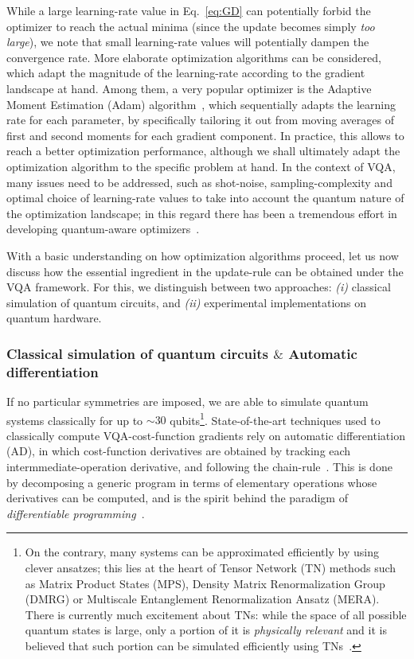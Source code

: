 While a large learning-rate value in Eq.~\ref{eq:GD} can potentially forbid the optimizer to reach the actual minima (since the update becomes simply \textit{too large}), we note that small learning-rate values will potentially dampen the convergence rate. More elaborate optimization algorithms can be considered, which adapt the magnitude of the learning-rate according to the gradient landscape at hand. Among them, a very popular optimizer is the Adaptive Moment Estimation (Adam) algorithm~\cite{kingma2015adam}, which sequentially adapts the learning rate for each parameter, by specifically tailoring it out from moving averages of first and second moments for each gradient component. In practice, this allows to reach a better optimization performance, although we shall ultimately adapt the optimization algorithm to the specific problem at hand. In the context of VQA, many issues need to be addressed, such as shot-noise, sampling-complexity and optimal choice of learning-rate values to take into account the quantum nature of the optimization landscape; in this regard there has been a tremendous effort in developing quantum-aware optimizers~\cite{verdon2018universal,kubler2020adaptive,arrasmith2020operator,stokes2020quantum,koczor2019quantum,nakanishi2020sequential,fontana2020optimizing,gu2021adaptive}.

With a basic understanding on how optimization algorithms proceed, let us now discuss how the essential ingredient in the update-rule can be obtained under the VQA framework. For this, we distinguish between two approaches: \textit{(i)} classical simulation of quantum circuits, and \textit{(ii)} experimental implementations on quantum hardware.

\subsubsection{Classical simulation of quantum circuits $\&$ Automatic differentiation}
If no particular symmetries are imposed, we are able to simulate quantum systems classically for up to $\sim 30$ qubits\footnote{On the contrary, many systems can be approximated efficiently by using clever ansatzes; this lies at the heart of Tensor Network (TN) methods such as Matrix Product States (MPS), Density Matrix Renormalization Group (DMRG) or Multiscale Entanglement Renormalization Ansatz (MERA). There is currently much excitement about TNs: while the space of all possible quantum states is large, only a portion of it is \textit{physically relevant} and it is believed that such portion can be simulated efficiently using TNs~\cite{Biamonte2017tensornetworks,orusTN}.}.
%
State-of-the-art techniques used to classically compute VQA-cost-function gradients rely on automatic differentiation (AD), in which cost-function derivatives are obtained by tracking each intermmediate-operation derivative, and following the chain-rule~\cite{broughton2020tensorflow,Luo2020yaojlextensible}. This is done by decomposing a generic program in terms of elementary operations whose derivatives can be computed, and is the spirit behind the paradigm of \textit{differentiable programming}~\cite{Rackauckas2020GeneralizedPL,Liao2019differentaible,dpcontrolsto}.

